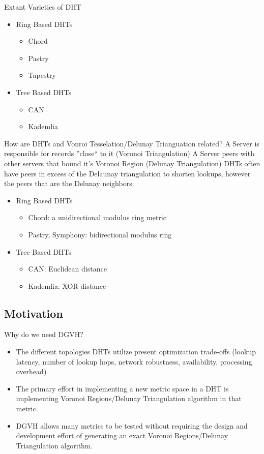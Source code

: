 \documentclass[8pt]{beamer}
\begin{document}
\begin{frame}{Extant Varieties of DHT}
	\begin{itemize}
		\item Ring Based DHTs
		\begin{itemize}
			\item Chord
			\item Pastry
			\item Tapestry
		\end{itemize}
		\item Tree Based DHTs
		\begin{itemize}
			\item CAN
			\item Kademlia
		\end{itemize}
	\end{itemize}
\end{frame}

\begin{frame}{How are DHTs and Vonroi Tesselation/Delunay Trianguation related?}
	A Server is responsible for records ''close`` to it (Voronoi Triangulation)
	A Server peers with other servers that bound it's Voronoi Region (Delunay Triangulation)
	DHTs often have peers in excess of the Delaunay triangulation to shorten lookups, however the peers that are the Delunay neighbors
	\begin{itemize}
		\item Ring Based DHTs
		\begin{itemize}
			\item Chord: a unidirectional modulus ring metric
			\item Pastry, Symphony: bidirectional modulus ring
		\end{itemize}
		\item Tree Based DHTs
		\begin{itemize}
			\item CAN: Euclidean distance
			\item Kademlia: XOR distance
		\end{itemize}
	\end{itemize}
\end{frame}

	\subsection{Motivation}
\begin{frame}{Why do we need DGVH?}
	\begin{itemize}
		\item The different topologies DHTs utilize present optimization trade-offs (lookup latency, number of lookup hops, network robustness, availability, processing overhead)
		\item The primary effort in implementing a new metric space in a DHT is implementing Voronoi Regions/Delunay Triangulation algorithm in that metric.
		\item DGVH allows many metrics to be tested without requiring the design and development effort of generating an exact Voronoi Regions/Delunay Triangulation algorithm.
		
	\end{itemize}

\end{frame}
\end{document}
